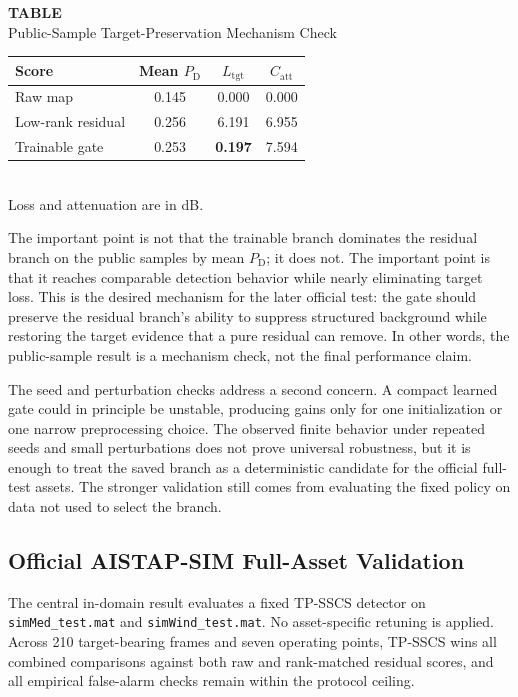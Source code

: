\documentclass[journal]{IEEEtran}
\newcommand{\SingleColumnTableBlock}[3]{%
  \begin{center}
  \begin{minipage}{\columnwidth}
  \centering
  \refstepcounter{table}\label{#1}%
  {\footnotesize\textbf{TABLE~\thetable}}\\[-0.2em]
  {\scriptsize #2}\\[0.35em]
  #3%
  \end{minipage}
  \end{center}
  \vspace{-0.05em}
}
\begin{document}
\SingleColumnTableBlock{tab:gate-mechanism}{Public-Sample Target-Preservation Mechanism Check}
{{\scriptsize
\setlength{\tabcolsep}{4.0pt}
\renewcommand{\arraystretch}{1.04}
\begin{tabular}{@{}lccc@{}}
\toprule
Score & Mean $P_{\mathrm{D}}$ & $L_{\mathrm{tgt}}$ & $C_{\mathrm{att}}$ \\
\midrule
Raw map & 0.145 & 0.000 & 0.000 \\
Low-rank residual & 0.256 & 6.191 & 6.955 \\
Trainable gate & 0.253 & \textbf{0.197} & 7.594 \\
\bottomrule
\end{tabular}\\[0.1em]
\scriptsize Loss and attenuation are in dB.
}}

The important point is not that the trainable branch dominates the residual branch on the public samples by mean $P_{\mathrm{D}}$; it does not. The important point is that it reaches comparable detection behavior while nearly eliminating target loss. This is the desired mechanism for the later official test: the gate should preserve the residual branch's ability to suppress structured background while restoring the target evidence that a pure residual can remove. In other words, the public-sample result is a mechanism check, not the final performance claim.

The seed and perturbation checks address a second concern. A compact learned gate could in principle be unstable, producing gains only for one initialization or one narrow preprocessing choice. The observed finite behavior under repeated seeds and small perturbations does not prove universal robustness, but it is enough to treat the saved branch as a deterministic candidate for the official full-test assets. The stronger validation still comes from evaluating the fixed policy on data not used to select the branch.

\subsection{Official AISTAP-SIM Full-Asset Validation}

The central in-domain result evaluates a fixed TP-SSCS detector on \texttt{simMed\_test.mat} and \texttt{simWind\_test.mat}. No asset-specific retuning is applied. Across 210 target-bearing frames and seven operating points, TP-SSCS wins all combined comparisons against both raw and rank-matched residual scores, and all empirical false-alarm checks remain within the protocol ceiling.
\end{document}
